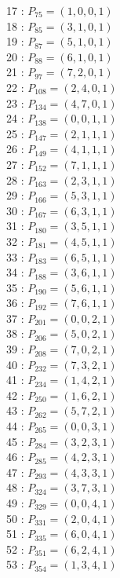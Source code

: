 \documentclass{article}
\begin{document}
{\begin{multicols}{3}
17 : $P_{75}=( 1, 0, 0, 1 )$\\
18 : $P_{85}=( 3, 1, 0, 1 )$\\
19 : $P_{87}=( 5, 1, 0, 1 )$\\
20 : $P_{88}=( 6, 1, 0, 1 )$\\
21 : $P_{97}=( 7, 2, 0, 1 )$\\
22 : $P_{108}=( 2, 4, 0, 1 )$\\
23 : $P_{134}=( 4, 7, 0, 1 )$\\
24 : $P_{138}=( 0, 0, 1, 1 )$\\
25 : $P_{147}=( 2, 1, 1, 1 )$\\
26 : $P_{149}=( 4, 1, 1, 1 )$\\
27 : $P_{152}=( 7, 1, 1, 1 )$\\
28 : $P_{163}=( 2, 3, 1, 1 )$\\
29 : $P_{166}=( 5, 3, 1, 1 )$\\
30 : $P_{167}=( 6, 3, 1, 1 )$\\
31 : $P_{180}=( 3, 5, 1, 1 )$\\
32 : $P_{181}=( 4, 5, 1, 1 )$\\
33 : $P_{183}=( 6, 5, 1, 1 )$\\
34 : $P_{188}=( 3, 6, 1, 1 )$\\
35 : $P_{190}=( 5, 6, 1, 1 )$\\
36 : $P_{192}=( 7, 6, 1, 1 )$\\
37 : $P_{201}=( 0, 0, 2, 1 )$\\
38 : $P_{206}=( 5, 0, 2, 1 )$\\
39 : $P_{208}=( 7, 0, 2, 1 )$\\
40 : $P_{232}=( 7, 3, 2, 1 )$\\
41 : $P_{234}=( 1, 4, 2, 1 )$\\
42 : $P_{250}=( 1, 6, 2, 1 )$\\
43 : $P_{262}=( 5, 7, 2, 1 )$\\
44 : $P_{265}=( 0, 0, 3, 1 )$\\
45 : $P_{284}=( 3, 2, 3, 1 )$\\
46 : $P_{285}=( 4, 2, 3, 1 )$\\
47 : $P_{293}=( 4, 3, 3, 1 )$\\
48 : $P_{324}=( 3, 7, 3, 1 )$\\
49 : $P_{329}=( 0, 0, 4, 1 )$\\
50 : $P_{331}=( 2, 0, 4, 1 )$\\
51 : $P_{335}=( 6, 0, 4, 1 )$\\
52 : $P_{351}=( 6, 2, 4, 1 )$\\
53 : $P_{354}=( 1, 3, 4, 1 )$\\

\end{multicols}}
\end{document}
